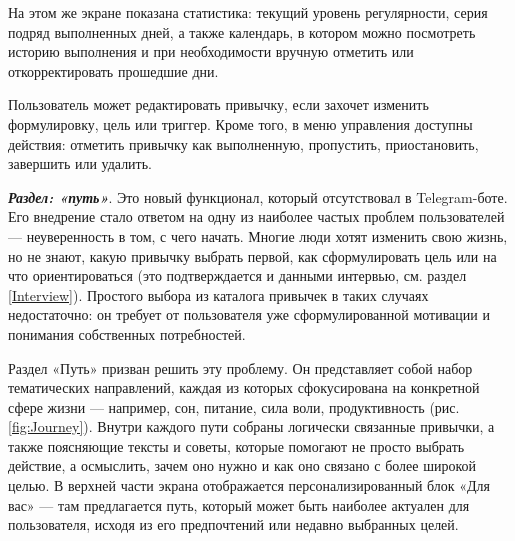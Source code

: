 \documentclass[pdflatex,sn-mathphys-num]{sn-jnl}%
\theoremstyle{thmstyleone}%
\theoremstyle{thmstyletwo}%
\theoremstyle{thmstylethree}%
\begin{document}
На этом же экране показана статистика: текущий уровень регулярности, серия подряд выполненных дней, а также календарь, в котором можно посмотреть историю выполнения и при необходимости вручную отметить или откорректировать прошедшие дни.

Пользователь может редактировать привычку, если захочет изменить формулировку, цель или триггер. Кроме того, в меню управления доступны действия: отметить привычку как выполненную, пропустить, приостановить, завершить или удалить.

\medskip

\textbf{\textit{Раздел: «путь»}}. Это новый функционал, который отсутствовал в Telegram-боте. Его внедрение стало ответом на одну из наиболее частых проблем пользователей — неуверенность в том, с чего начать. Многие люди хотят изменить свою жизнь, но не знают, какую привычку выбрать первой, как сформулировать цель или на что ориентироваться (это подтверждается и данными интервью, см. раздел \ref{Interview}). Простого выбора из каталога привычек в таких случаях недостаточно: он требует от пользователя уже сформулированной мотивации и понимания собственных потребностей.

Раздел «Путь» призван решить эту проблему. Он представляет собой набор тематических направлений, каждая из которых сфокусирована на конкретной сфере жизни — например, сон, питание, сила воли, продуктивность (рис. \ref{fig:Journey}). Внутри каждого пути собраны логически связанные привычки, а также поясняющие тексты и советы, которые помогают не просто выбрать действие, а осмыслить, зачем оно нужно и как оно связано с более широкой целью. В верхней части экрана отображается персонализированный блок «Для вас» — там предлагается путь, который может быть наиболее актуален для пользователя, исходя из его предпочтений или недавно выбранных целей.
\end{document}
